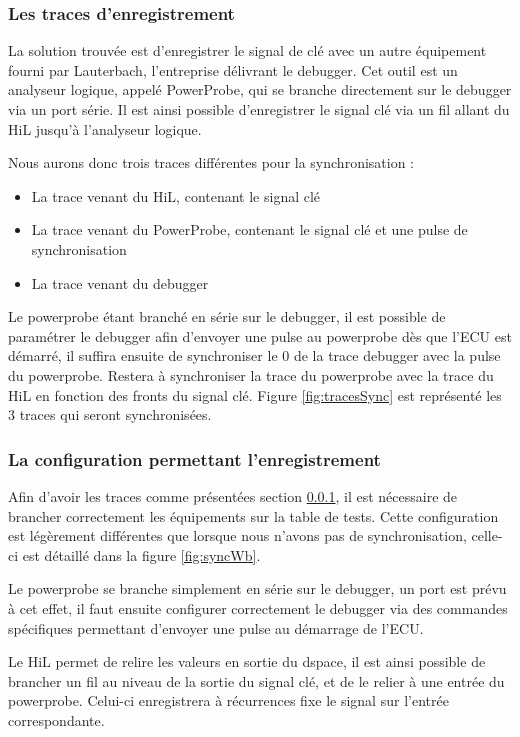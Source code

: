 \subsubsection{Les traces d'enregistrement}\label{tracesSync}
La solution trouvée est d'enregistrer le signal de clé avec un autre équipement fourni par Lauterbach, l'entreprise délivrant le debugger. Cet outil est un analyseur logique, appelé PowerProbe, qui se branche directement sur le debugger via un port série. Il est ainsi possible d'enregistrer le signal clé via un fil allant du HiL jusqu'à l'analyseur logique.

Nous aurons donc trois traces différentes pour la synchronisation : 
\begin{itemize}
	\item La trace venant du HiL, contenant le signal clé
	\item La trace venant du PowerProbe, contenant le signal clé et une pulse de synchronisation
	\item La trace venant du debugger
\end{itemize}

Le powerprobe étant branché en série sur le debugger, il est possible de paramétrer le debugger afin d'envoyer une pulse au powerprobe dès que l'ECU est démarré, il suffira ensuite de synchroniser le 0 de la trace debugger avec la pulse du powerprobe. Restera à synchroniser la trace du powerprobe avec la trace du HiL en fonction des fronts du signal clé. Figure \ref{fig:tracesSync} est représenté les 3 traces qui seront synchronisées. 

\subsubsection{La configuration permettant l'enregistrement}
Afin d'avoir les traces comme présentées section  \ref{tracesSync}, il est nécessaire de brancher correctement les équipements sur la table de tests. Cette configuration est légèrement différentes que lorsque nous n'avons pas de synchronisation, celle-ci est détaillé dans la figure \ref{fig:syncWb}.

Le powerprobe se branche simplement en série sur le debugger, un port est prévu à cet effet, il faut ensuite configurer correctement le debugger via des commandes spécifiques permettant d'envoyer une pulse au démarrage de l'ECU. 

Le HiL permet de relire les valeurs en sortie du dspace, il est ainsi possible de brancher un fil au niveau de la sortie du signal clé, et de le relier à une entrée du powerprobe. Celui-ci enregistrera à récurrences fixe le signal sur l'entrée correspondante. 

